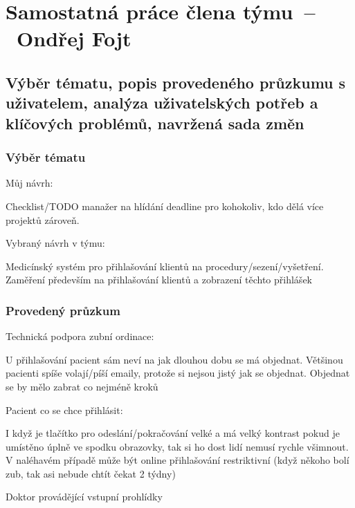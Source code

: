 \section{Samostatná práce člena týmu\ --\ Ondřej Fojt}
\label{sec:individual_work_ondra}

\subsection{Výběr tématu, popis provedeného průzkumu s uživatelem, analýza uživatelských potřeb a klíčových problémů, navržená sada změn}

\subsubsection*{Výběr tématu}

{\large Můj návrh:}

Checklist/TODO manažer na hlídání deadline pro kohokoliv, kdo dělá více projektů zároveň.


{\noindent \large Vybraný návrh v týmu:}

Medicínský systém pro přihlašování klientů na procedury/sezení/vyšetření. Zaměření především na přihlašování klientů a zobrazení těchto přihlášek

\subsubsection*{Provedený průzkum}

{ \noindent \large Technická podpora zubní ordinace:}

U přihlašování pacient sám neví na jak dlouhou dobu se má objednat. Většinou pacienti spíše volají/píší emaily, protože si nejsou jistý jak se objednat. Objednat se by mělo zabrat co nejméně kroků

{\noindent \large Pacient co se chce přihlásit:}

I když je tlačítko pro odeslání/pokračování velké a má velký kontrast pokud je umístěno úplně ve spodku obrazovky, tak si ho dost lidí nemusí rychle všimnout. V naléhavém případě může být online přihlašování restriktivní (když někoho bolí zub, tak asi nebude chtít čekat 2 týdny)

{\noindent \large Doktor provádějící vstupní prohlídky}

